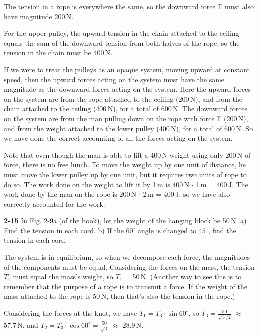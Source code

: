 \documentclass{amsart}
\begin{document}
The tension in a rope is everywhere the same, so the downward force F must also have magnitude 200\,N.

For the upper pulley, the upward tension in the chain attached to the ceiling equals the sum of the downward tension from
both halves of the rope, so the tension in the chain must be 400\,N.

If we were to treat the pulleys as an opaque system, moving upward at constant speed, then the upward
forces acting on the system must have the same magnitude as the downward forces acting on the system.
Here the upward forces on the system are from the rope attached to the ceiling (200\,N),
and from the chain attached to the ceiling (400\,N), for a total of 600\,N.
The downward forces on the system are from the man pulling down on the rope with force F (200\,N),
and from the weight attached to the lower pulley (400\,N), for a total of 600\,N.
So we have done the correct accounting of all the forces acting on the system.

Note that even though the man is able to lift a 400\,N weight using only 200\,N of force,
there is no free lunch.  To move the weight up by one unit of distance, he must move the lower pulley up
by one unit, but it requires two units of rope to do so.
The work done on the weight to lift it by 1\,m is 400\,N $\cdot$ 1\,m = 400\,J.
The work done by the man on the rope is 200\,N $\cdot$ 2\,m = 400\,J,
so we have also correctly accounted for the work.

\vspace{\baselineskip}
\noindent
\textbf{2-15} In Fig. 2-9a (of the book), let the weight of the hanging block be 50\,N.\newline
a) Find the tension in each cord.\newline
b) If the $60^\circ$ angle is changed to $45^\circ$, find the tension in each cord.

The system is in equilibrium, so when we decompose each force, the magnitudes of the components must be equal.
Considering the forces on the mass, the tension $T_1$ must equal the mass's weight, so $T_1$ = 50\,N.
(Another way to see this is to remember that the purpose of a rope is to transmit a force.
If the weight of the mass attached to the rope is 50\,N, then that's also the tension in the rope.)

Considering the forces at the knot,
we have
$T_1 = T_3 \cdot \sin 60^\circ$, so $T_3 = \frac{50}{\sqrt{3}/2}$ $\approx$ 57.7\,N,
and $T_2 = T_3 \cdot \cos 60^\circ = \frac{50}{\sqrt{3}}$ $\approx$ 28.9\,N.
\end{document}
